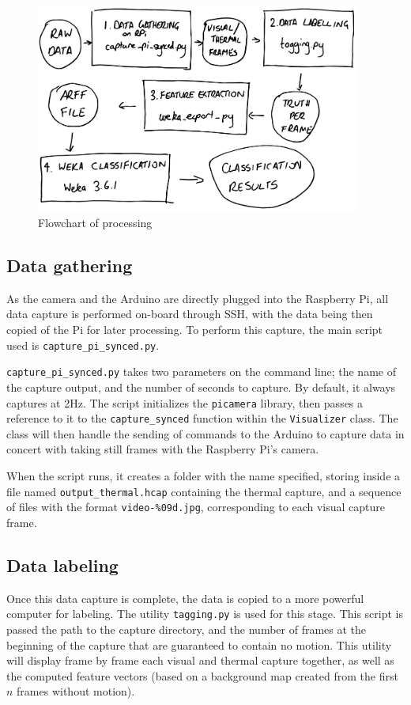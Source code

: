 \documentclass[../thesis/thesis.tex]{subfiles}
\begin{document}
\begin{figure}
\centering
\includegraphics[width=0.95\textwidth]{../diagrams/temp/method-flowchart.pdf}
\caption{Flowchart of processing}
\label{fig:methods:flowchart}
\end{figure}

\subsection{Data gathering}
As the camera and the Arduino are directly plugged into the Raspberry Pi, all data capture is performed on-board through SSH, with the data being then copied of the Pi for later processing. To perform this capture, the main script used is \texttt{capture\_pi\_synced.py}.

\texttt{capture\_pi\_synced.py} takes two parameters on the command line; the name of the capture output, and the number of seconds to capture. By default, it always captures at 2Hz. The script initializes the \texttt{picamera} library, then passes a reference to it to the \texttt{capture\_synced} function within the \texttt{Visualizer} class. The class will then handle the sending of commands to the Arduino to capture data in concert with taking still frames with the Raspberry Pi's camera.

When the script runs, it creates a folder with the name specified, storing inside a file named \texttt{output\_thermal.hcap} containing the thermal capture, and a sequence of files with the format \texttt{video-\%09d.jpg}, corresponding to each visual capture frame.

\subsection{Data labeling}
Once this data capture is complete, the data is copied to a more powerful computer for labeling. The utility \texttt{tagging.py} is used for this stage. This script is passed the path to the capture directory, and the number of frames at the beginning of the capture that are guaranteed to contain no motion. This utility will display frame by frame each visual and thermal capture together, as well as the computed feature vectors (based on a background map created from the first $n$ frames without motion).
\end{document}
